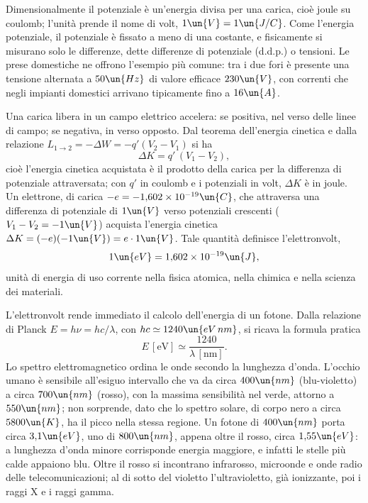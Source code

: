 \documentclass[main.tex]{subfiles}
\begin{document}
	Dimensionalmente il potenziale è un'energia divisa per una carica, cioè joule su coulomb; l'unità prende il nome di volt, $1\un{V}=1\un{J/C}$. Come l'energia potenziale, il potenziale è fissato a meno di una costante, e fisicamente si misurano solo le differenze, dette differenze di potenziale (d.d.p.) o tensioni. Le prese domestiche ne offrono l'esempio più comune: tra i due fori è presente una tensione alternata a $50\un{Hz}$ di valore efficace $230\un{V}$, con correnti che negli impianti domestici arrivano tipicamente fino a $16\un{A}$.
	
	Una carica libera in un campo elettrico accelera: se positiva, nel verso delle linee di campo; se negativa, in verso opposto. Dal teorema dell'energia cinetica e dalla relazione $L_{1\to2}=-\Delta W=-q'(V_2-V_1)$ si ha
	\[
	\Delta K=q'\,(V_1-V_2),
	\]
	cioè l'energia cinetica acquistata è il prodotto della carica per la differenza di potenziale attraversata; con $q'$ in coulomb e i potenziali in volt, $\Delta K$ è in joule. Un elettrone, di carica $-e=-1{,}602\times10^{-19}\un{C}$, che attraversa una differenza di potenziale di $1\un{V}$ verso potenziali crescenti ($V_1-V_2=-1\un{V}$) acquista l'energia cinetica $\Delta K=(-e)(-1\un{V})=e\cdot1\un{V}$. Tale quantità definisce l'elettronvolt,
	\[
	1\un{eV}=1{,}602\times10^{-19}\un{J},
	\]
	unità di energia di uso corrente nella fisica atomica, nella chimica e nella scienza dei materiali.
	
	L'elettronvolt rende immediato il calcolo dell'energia di un fotone. Dalla relazione di Planck $E=h\nu=hc/\lambda$, con $hc\simeq1240\un{eV\,nm}$, si ricava la formula pratica
	\[
	E\,[\mathrm{eV}]\simeq\frac{1240}{\lambda\,[\mathrm{nm}]}.
	\]
	Lo spettro elettromagnetico ordina le onde secondo la lunghezza d'onda. L'occhio umano è sensibile all'esiguo intervallo che va da circa $400\un{nm}$ (blu-violetto) a circa $700\un{nm}$ (rosso), con la massima sensibilità nel verde, attorno a $550\un{nm}$; non sorprende, dato che lo spettro solare, di corpo nero a circa $5800\un{K}$, ha il picco nella stessa regione.
	Un fotone di $400\un{nm}$ porta circa $3{,}1\un{eV}$, uno di $800\un{nm}$, appena oltre il rosso, circa $1{,}55\un{eV}$: a lunghezza d'onda minore corrisponde energia maggiore, e infatti le stelle più calde appaiono blu. Oltre il rosso si incontrano infrarosso, microonde e onde radio delle telecomunicazioni; al di sotto del violetto l'ultravioletto, già ionizzante, poi i raggi X e i raggi gamma.
	
\end{document}
